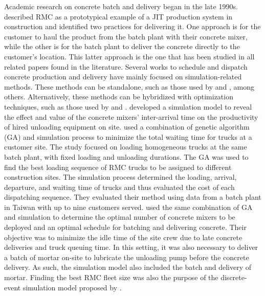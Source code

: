 \documentclass{article}
\begin{document}
Academic research on concrete batch and delivery began in the late 1990s. \cite{tommelein1999just} described RMC as a prototypical example of a JIT production system in construction and identified two practices for delivering it. One approach is for the customer to haul the product from the batch plant with their concrete mixer, while the other is for the batch plant to deliver the concrete directly to the customer's location. This latter approach is the one that has been studied in all related papers found in the literature. Several works to schedule and dispatch concrete production and delivery have mainly focused on simulation-related methods. These methods can be standalone, such as those used by \cite{zayed2001simulation, wang2001scheduling} and  \cite{panas_simulation_based_2013}, among others. Alternatively, these methods can be hybridized with optimization techniques, such as those used by \cite{feng2004optimizing} and \cite{lu2005optimized}. \cite{wang2001scheduling} developed a simulation model to reveal the effect and value of the concrete mixers' inter-arrival time on the productivity of hired unloading equipment on site. \cite{feng2004optimizing} used a combination of genetic algorithm (GA) and simulation process to minimize the total waiting time for trucks at a customer site. The study focused on loading homogeneous trucks at the same batch plant, with fixed loading and unloading durations. The GA was used to find the best loading sequence of RMC trucks to be assigned to different construction sites. The simulation process determined the loading, arrival, departure, and waiting time of trucks and thus evaluated the cost of each dispatching sequence. They evaluated their method using data from a batch plant in Taiwan with up to nine customers served. \cite{lu2005optimized} used the same combination of GA and simulation to determine the optimal number of concrete mixers to be deployed and an optimal schedule for batching and delivering concrete. Their objective was to minimize the idle time of the site crew due to late concrete deliveries and truck queuing time. In this setting, it was also necessary to deliver a batch of mortar on-site to lubricate the unloading pump before the concrete delivery. As such, the simulation model also included the batch and delivery of mortar. Finding the best RMC fleet size was also the purpose of the discrete-event simulation model proposed by \cite{panas_simulation_based_2013}.
\end{document}
